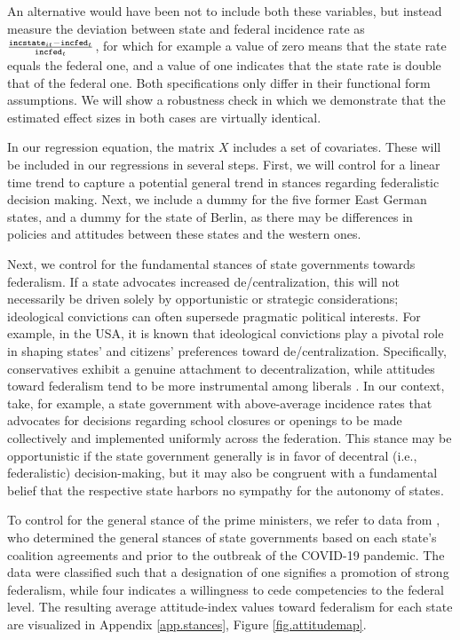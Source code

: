 \documentclass[12pt, abstracton]{scrartcl}
\begin{document}
An alternative would have been not to include both these variables, but instead measure the deviation between state and federal incidence rate as  $\frac{\text{\texttt{incstate}}_{it} - \text{\texttt{incfed}}_{t}}{\text{\texttt{incfed}}_{t}}$, for which for example a value of zero means that the state rate equals the federal one, and a value of one indicates that the state rate is double that of the federal one. Both specifications only differ in their functional form assumptions. We will show a robustness check in which we demonstrate that the estimated effect sizes in both cases are virtually identical.

In our regression equation, the matrix $X$ includes a set of covariates. These will be included in our regressions in several steps. First, we will control for a linear time trend to capture a potential general trend in stances regarding federalistic decision making. Next, we include a dummy for the five former East German states, and a dummy for the state of Berlin, as there may be differences in policies and attitudes between these states and the western ones. 

Next, we control for the fundamental stances of state governments towards federalism. If a state advocates increased de/centralization, this will not necessarily be driven solely by opportunistic or strategic considerations; ideological convictions can often supersede pragmatic political interests. For example, in the USA, it is known that ideological convictions play a pivotal role in shaping states' and citizens' preferences toward de/centralization. Specifically, conservatives exhibit a genuine attachment to decentralization, while attitudes toward federalism tend to be more instrumental among liberals \citep{Glaser2023, Rendleman2022}. In our context, take, for example, a state government with above-average incidence rates that advocates for decisions regarding school closures or openings to be made collectively and implemented uniformly across the federation. This stance may be opportunistic if the state government generally is in favor of decentral (i.e., federalistic) decision-making, but it may also be congruent with a fundamental belief that the respective state harbors no sympathy for the autonomy of states.

To control for the general stance of the prime ministers, we refer to data from \cite{BarbaroRode2024}, who determined the general stances of state governments based on each state's coalition agreements and prior to the outbreak of the COVID-19 pandemic. The data were classified such that a designation of one signifies a promotion of strong federalism, while four indicates a willingness to cede competencies to the federal level. The resulting average attitude-index values toward federalism for each state are visualized in Appendix \ref{app.stances}, Figure \ref{fig.attitudemap}. 
\end{document}
